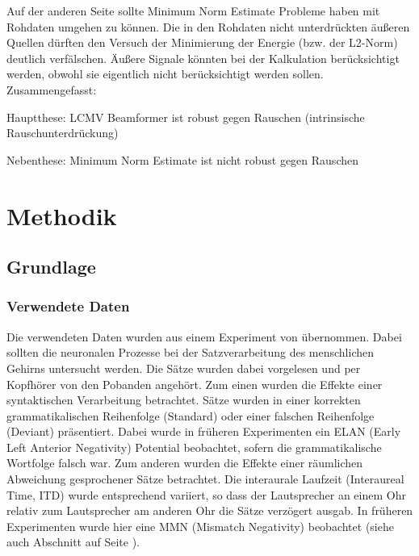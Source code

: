 \documentclass[doc,a4paper,12pt]{apa6}
\makeatletter
\DeclareRobustCommand*{\nameref}[1]{%
      \glqq{\myorg@nameref{#1}}\grqq%
    }%
\makeatother
\begin{document}
Auf der anderen Seite sollte Minimum Norm Estimate Probleme haben mit Rohdaten umgehen zu können. Die in den Rohdaten nicht unterdrückten äußeren Quellen dürften den Versuch der Minimierung der Energie (bzw. der L2-Norm) deutlich verfälschen. Äußere Signale könnten bei der Kalkulation berücksichtigt werden, obwohl sie eigentlich nicht berücksichtigt werden sollen. Zusammengefasst:

\begin{compactitem}
\item Hauptthese: LCMV Beamformer ist robust gegen Rauschen (intrinsische Rauschunterdrückung)
\item Nebenthese: Minimum Norm Estimate ist nicht robust gegen Rauschen
\end{compactitem}


\newpage

\section{Methodik}
\label{sec:methodik}

\subsection{Grundlage}

\subsubsection{Verwendete Daten}

Die verwendeten Daten wurden aus einem Experiment von \textcite{herrmann2011syntactic} übernommen. Dabei sollten die neuronalen Prozesse bei der Satzverarbeitung des menschlichen Gehirns untersucht werden. Die Sätze wurden dabei vorgelesen und per Kopfhörer von den Pobanden angehört. Zum einen wurden die Effekte einer syntaktischen Verarbeitung betrachtet. Sätze wurden in einer korrekten grammatikalischen Reihenfolge (Standard) oder einer falschen Reihenfolge (Deviant) präsentiert. Dabei wurde in früheren Experimenten ein ELAN (Early Left Anterior Negativity) Potential beobachtet, sofern die grammatikalische Wortfolge falsch war. Zum anderen wurden die Effekte einer räumlichen Abweichung gesprochener Sätze betrachtet. Die interaurale Laufzeit (Interaureal Time, ITD) wurde entsprechend variiert, so dass der Lautsprecher an einem Ohr relativ zum Lautsprecher am anderen Ohr die Sätze verzögert ausgab. In früheren Experimenten wurde hier eine MMN (Mismatch Negativity) beobachtet (siehe auch Abschnitt \nameref{sec:erf} auf Seite \pageref{sec:erf}).
\end{document}
